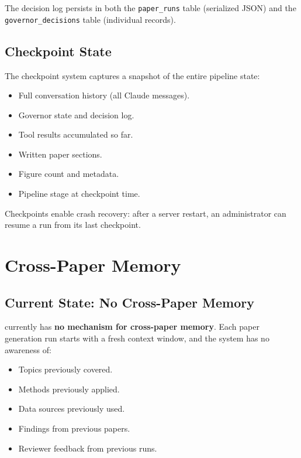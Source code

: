 The decision log persists in both the \texttt{paper\_runs} table (serialized JSON) and the \texttt{governor\_decisions} table (individual records).

\subsection{Checkpoint State}

The checkpoint system captures a snapshot of the entire pipeline state:

\begin{itemize}
  \item Full conversation history (all Claude messages).
  \item Governor state and decision log.
  \item Tool results accumulated so far.
  \item Written paper sections.
  \item Figure count and metadata.
  \item Pipeline stage at checkpoint time.
\end{itemize}

Checkpoints enable crash recovery: after a server restart, an administrator can resume a run from its last checkpoint.

\section{Cross-Paper Memory}
\label{sec:memory:cross-paper}

\subsection{Current State: No Cross-Paper Memory}

\autoscholar currently has \textbf{no mechanism for cross-paper memory}.
Each paper generation run starts with a fresh context window, and the system has no awareness of:

\begin{itemize}
  \item Topics previously covered.
  \item Methods previously applied.
  \item Data sources previously used.
  \item Findings from previous papers.
  \item Reviewer feedback from previous runs.
\end{itemize}

